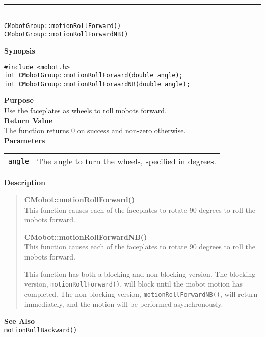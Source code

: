 \noindent
\vspace{5pt}
\rule{4.5in}{0.015in}\\
\noindent
{\LARGE \texttt{CMobotGroup::motionRollForward()}}\\
{\LARGE \texttt{CMobotGroup::motionRollForwardNB()}}\\
{}

\noindent
{\bf Synopsis}
\vspace{-8pt}
\begin{verbatim}
#include <mobot.h>
int CMobotGroup::motionRollForward(double angle);
int CMobotGroup::motionRollForwardNB(double angle);
\end{verbatim}

\noindent
{\bf Purpose}\\
Use the faceplates as wheels to roll mobots forward.\\

\noindent
{\bf Return Value}\\
The function returns 0 on success and non-zero otherwise.\\

\noindent
{\bf Parameters}\\
\vspace{-0.1in}
\begin{description}
\item               
\begin{tabular}{p{15 mm}p{145 mm}}
\texttt{angle} & The angle to turn the wheels, specified in degrees.\\
\end{tabular}
\end{description}

\noindent
{\bf Description}\\
\vspace{-12pt}
\begin{quote}
{\bf CMobot::motionRollForward()}\\
This function causes each of the faceplates to rotate 90 degrees to roll the
mobots forward.

{\bf CMobot::motionRollForwardNB()}\\
This function causes each of the faceplates to rotate 90 degrees to roll the
mobots forward.

This function has both a blocking and non-blocking version.
The blocking version, \texttt{motionRollForward()}, will block until the
mobot motion has completed. The non-blocking version, \texttt{motionRollForwardNB()},
will return immediately, and the motion will be performed asynchronously.\\
\end{quote}

\noindent
{\bf See Also}\\
\texttt{motionRollBackward()}

